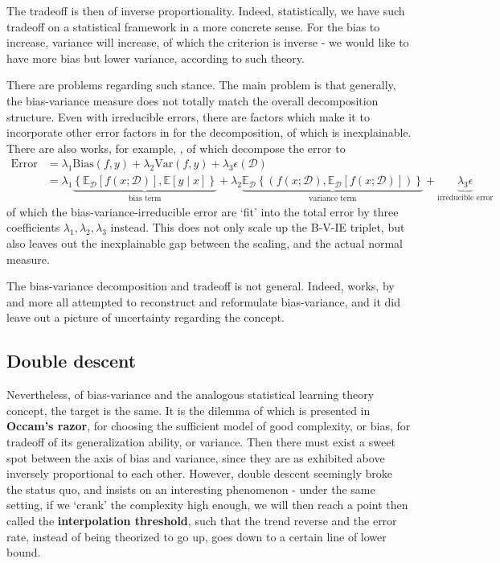 \documentclass[10pt]{article}
\begin{document}
The tradeoff is then of inverse proportionality. Indeed, statistically, we have such tradeoff on a statistical framework in a more concrete sense. For the bias to increase, variance will increase, of which the criterion is inverse - we would like to have more bias but lower variance, according to such theory. 

There are problems regarding such stance. The main problem is that generally, the bias-variance measure does not totally match the overall decomposition structure. Even with irreducible errors, there are factors which make it to incorporate other error factors in for the decomposition, of which is inexplainable. There are also works, for example, \cite{domingos_unifeid_2000}, of which decompose the error to 
\begin{equation*}
        \begin{split}
            \mathrm{Error} & = \lambda_{1} \mathrm{Bias}(f,y) + \lambda_{2}\mathrm{Var}(f,y)+ \lambda_{3}\epsilon(\mathcal{D})\\ 
            & = \lambda_{1}\underbrace{\left\{ \mathbb{E}_{\mathcal{D}}[f(x;\mathcal{D})] , \mathbb{E}[y\mid x] \right\}}_{\text{bias term}} +\lambda_{2} \underbrace{\mathbb{E}_{\mathcal{D}} \left\{(f(x;\mathcal{D}), \mathbb{E}_{\mathcal{D}}[f(x;\mathcal{D})])\right\}}_{\text{variance term}} +\underbrace{\lambda_{3}\epsilon}_{\text{irreducible error}}
        \end{split}
\end{equation*}
of which the bias-variance-irreducible error are `fit' into the total error by three coefficients $\lambda_{1},\lambda_{2},\lambda_{3}$ instead. This does not only scale up the B-V-IE triplet, but also leaves out the inexplainable gap between the scaling, and the actual normal measure. 

The bias-variance decomposition and tradeoff is not general. Indeed, works, by \cite{6797087,sharma_bias-variance_2014,domingos_unifeid_2000,adlam2020understandingdoubledescentrequires,yang_rethinking_2020} and more all attempted to reconstruct and reformulate bias-variance, and it did leave out a picture of uncertainty regarding the concept. 

\subsection{Double descent}

Nevertheless, of bias-variance and the analogous statistical learning theory concept, the target is the same. It is the dilemma of which is presented in \textbf{Occam's razor}, for choosing the sufficient model of good complexity, or bias, for tradeoff of its generalization ability, or variance. Then there must exist a sweet spot between the axis of bias and variance, since they are as exhibited above inversely proportional to each other. However, double descent seemingly broke the status quo, and insists on an interesting phenomenon - under the same setting, if we `crank' the complexity high enough, we will then reach a point then called the \textbf{interpolation threshold}, such that the trend reverse and the error rate, instead of being theorized to go up, goes down to a certain line of lower bound. 
\end{document}
